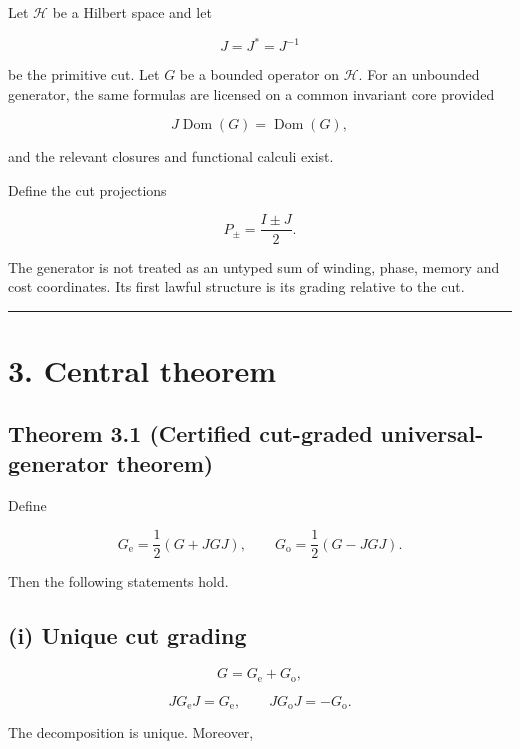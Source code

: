 Let \(\mathcal H\) be a Hilbert space and let

\[
J=J^*=J^{-1}
\]

be the primitive cut. Let \(G\) be a bounded operator on \(\mathcal H\). For an
unbounded generator, the same formulas are licensed on a common invariant core
provided

\[
J\operatorname{Dom}(G)=\operatorname{Dom}(G),
\]

and the relevant closures and functional calculi exist.

Define the cut projections

\[
P_\pm=\frac{I\pm J}{2}.
\]

The generator is not treated as an untyped sum of winding, phase, memory and
cost coordinates. Its first lawful structure is its grading relative to the
cut.

\begin{center}\rule{0.5\linewidth}{0.5pt}\end{center}

\hypertarget{central-theorem}{%
\section{3. Central theorem}\label{central-theorem}}

\hypertarget{theorem-3.1-certified-cut-graded-universal-generator-theorem}{%
\subsection{Theorem 3.1 (Certified cut-graded universal-generator theorem)}\label{theorem-3.1-certified-cut-graded-universal-generator-theorem}}

Define

\[
\boxed{
G_{\mathrm e}=\frac12(G+JGJ),
\qquad
G_{\mathrm o}=\frac12(G-JGJ).
}
\tag{3.1}
\]

Then the following statements hold.

\hypertarget{i-unique-cut-grading}{%
\subsection{(i) Unique cut grading}\label{i-unique-cut-grading}}

\[
\boxed{G=G_{\mathrm e}+G_{\mathrm o},}
\tag{3.2}
\]

\[
\boxed{
JG_{\mathrm e}J=G_{\mathrm e},
\qquad
JG_{\mathrm o}J=-G_{\mathrm o}.
}
\tag{3.3}
\]

The decomposition is unique. Moreover,

